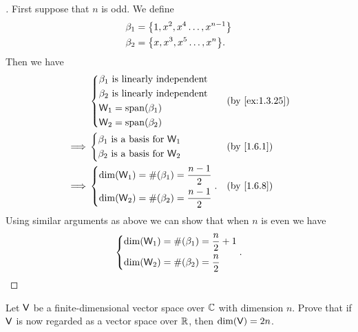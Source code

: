 \begin{proof}[]
  First suppose that \(n\) is odd.
  We define
  \begin{align*}
    \beta_1 & = \set{1, x^2, x^4 \dots, x^{n - 1}} \\
    \beta_2 & = \set{x, x^3, x^5 \dots, x^n}.
  \end{align*}
  Then we have
  \begin{align*}
             & \begin{dcases}
      \beta_1 \text{ is linearly independent} \\
      \beta_2 \text{ is linearly independent} \\
      \W_1 = \spn{\beta_1}                    \\
      \W_2 = \spn{\beta_2}
    \end{dcases}  &  & \text{(by \cref{ex:1.3.25})} \\
    \implies & \begin{dcases}
      \beta_1 \text{ is a basis for } \W_1 \\
      \beta_2 \text{ is a basis for } \W_2
    \end{dcases}  &  & \text{(by \cref{1.6.1})}     \\
    \implies & \begin{dcases}
      \dim(\W_1) = \#(\beta_1) = \frac{n - 1}{2} \\
      \dim(\W_2) = \#(\beta_2) = \frac{n - 1}{2}
    \end{dcases}. &  & \text{(by \cref{1.6.8})}
  \end{align*}
  Using similar arguments as above we can show that when \(n\) is even we have
  \[
    \begin{dcases}
      \dim(\mathsf{W}_1) = \#(\beta_1) = \frac{n}{2} + 1 \\
      \dim(\mathsf{W}_2) = \#(\beta_2) = \frac{n}{2}
    \end{dcases}.
  \]
\end{proof}

\begin{ex}\label{ex:1.6.28}
  Let \(\mathsf{V}\) be a finite-dimensional vector space over \(\mathbb{C}\) with dimension \(n\).
  Prove that if \(\mathsf{V}\) is now regarded as a vector space over \(\mathbb{R}\), then \(\dim(\mathsf{V}) = 2n\).
\end{ex}

